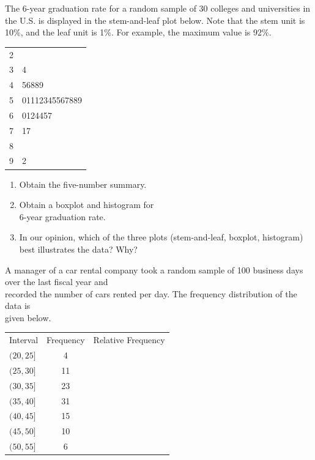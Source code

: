 \documentclass[11pt, chapterprefix=true]{scrbook}\usepackage[]{graphicx}\usepackage[]{color}
\begin{document}
\begin{exercises}
  \begin{exercise} %

The 6-year graduation rate for a random sample of 30 colleges and universities
in the U.S. is displayed in the stem-and-leaf plot below.  Note that the stem unit is 10\%, and the leaf unit is 1\%.  For example, the maximum value is 92\%.

\begin{table}[ht]
\centering
{\small{
\begin{tabular}{@{} r|l @{}} \hline
2 & \\
3 & 4 \\
4 & 56889 \\
5 & 01112345567889 \\
6 & 0124457 \\
7 & 17 \\
8 & \\
9 & 2 \\ \hline
\end{tabular}
}}
\end{table}

	  \begin{enumerate}
	  \item Obtain the five-number summary.
    \item Obtain a boxplot and histogram for \\ 6-year graduation rate.
    \item In our opinion, which of the three plots (stem-and-leaf, boxplot, histogram) \\ best illustrates the data? Why?
	  \end{enumerate}

	\end{exercise}

  \begin{exercise} %

A manager of a car rental company took a random sample of 100 business days over the last fiscal year and \\ recorded the number of cars rented per day.  The frequency distribution of the data is \\ given below.

\begin{tabular}{@{} lcc @{}} \hline
Interval  &  Frequency &	Relative Frequency \\
$(20, 25]$ 	&      4 \\
$(25, 30]$ 	&    11  \\
$(30, 35]$ 	&    23 \\
$(35, 40]$ 	&    31 \\
$(40, 45]$ 	&    15 \\
$(45, 50]$ 	&    10 \\
$(50, 55]$ 	&      6 \\ \hline
\end{tabular}


\end{exercise}
\end{exercises}
\end{document}
